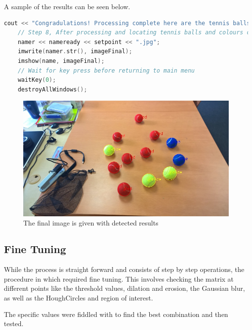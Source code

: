 \documentclass[a4paper, 10pt]{article}
\begin{document}
A sample of the results can be seen below.

\begin{lstlisting}[language = C++]
	cout << "Congradulations! Processing complete here are the tennis balls found with their respected colours!\n\npress any key to go back to main menu, or hit esc twice to quit\n\n-------------------------------------------------------------------------\n" << endl;
	// Step 8, After processing and locating tennis balls and colours complete, display final results, and save for reference
	namer << nameready << setpoint << ".jpg";
	imwrite(namer.str(), imageFinal);
	imshow(name, imageFinal); 
	// Wait for key press before returning to main menu
	waitKey(0);
	destroyAllWindows();
\end{lstlisting}

\begin{figure}[H]
  \includegraphics[width=\linewidth]{images/Final}
  \caption{The final image is given with detected results}
  \label{fig:The final image is given with detected results}
\end{figure}



\subsection{Fine Tuning} 

While the process is straight forward and consists of step by step operations, the procedure in which required fine tuning. This involves checking the matrix at different points like the threshold values, dilation and erosion, the Gaussian blur, as well as the HoughCircles and region of interest.

The specific values were fiddled with to find the best combination and then tested.
\end{document}
